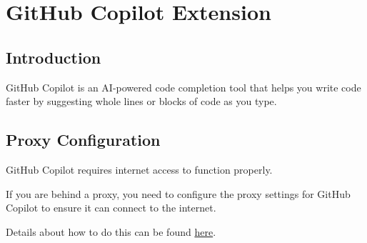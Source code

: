 %
%
%
\chapter{GitHub Copilot Extension}
\label{chap:copilot}

\section{Introduction}
GitHub Copilot is an AI-powered code completion tool that helps you write code
faster by suggesting whole lines or blocks of code as you type.

\section{Proxy Configuration}
GitHub Copilot requires internet access to function properly.

If you are behind a proxy, you need to configure the proxy settings for
GitHub Copilot to ensure it can connect to the internet.

Details about how to do this can be found
\hyperref[fw-environment-environment-proxy-configuration]{here}.



